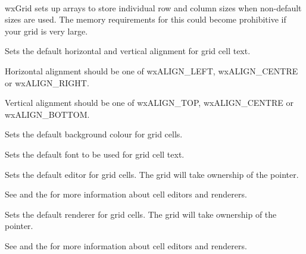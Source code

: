\\
wxGrid sets up arrays to store individual row and column sizes when non-default sizes are used.
The memory requirements for this could become prohibitive if your grid is very large. 

\label{wxgridsetdefaultcellalignment}


Sets the default horizontal and vertical alignment for grid cell text.

Horizontal alignment should be one of wxALIGN\_LEFT, wxALIGN\_CENTRE or wxALIGN\_RIGHT.

Vertical alignment should be one of wxALIGN\_TOP, wxALIGN\_CENTRE or wxALIGN\_BOTTOM.

\label{wxgridsetdefaultcellbackgroundcolour}


Sets the default background colour for grid cells.

\label{wxgridsetdefaultcellfont}


Sets the default font to be used for grid cell text.

\label{wxgridsetdefaulteditor}


Sets the default editor for grid cells. The grid will take ownership of the pointer.

See  and
the  for more information about cell editors and renderers.

\label{wxgridsetdefaultrenderer}


Sets the default renderer for grid cells. The grid will take ownership of the pointer.

See  and
the  for more information about cell editors and renderers.

